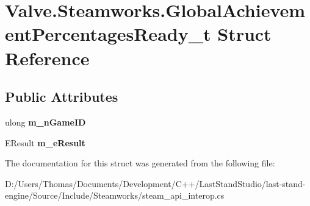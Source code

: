 \hypertarget{structValve_1_1Steamworks_1_1GlobalAchievementPercentagesReady__t}{}\section{Valve.\+Steamworks.\+Global\+Achievement\+Percentages\+Ready\+\_\+t Struct Reference}
\label{structValve_1_1Steamworks_1_1GlobalAchievementPercentagesReady__t}
\subsection*{Public Attributes}
\begin{DoxyCompactItemize}
\item 
\hypertarget{structValve_1_1Steamworks_1_1GlobalAchievementPercentagesReady__t_a77425795406927d23ceef9a3f353b278}{}ulong {\bfseries m\+\_\+n\+Game\+I\+D}\label{structValve_1_1Steamworks_1_1GlobalAchievementPercentagesReady__t_a77425795406927d23ceef9a3f353b278}

\item 
\hypertarget{structValve_1_1Steamworks_1_1GlobalAchievementPercentagesReady__t_aef45d07893b5ebfeaae5ac46131b3497}{}E\+Result {\bfseries m\+\_\+e\+Result}\label{structValve_1_1Steamworks_1_1GlobalAchievementPercentagesReady__t_aef45d07893b5ebfeaae5ac46131b3497}

\end{DoxyCompactItemize}


The documentation for this struct was generated from the following file\+:\begin{DoxyCompactItemize}
\item 
D\+:/\+Users/\+Thomas/\+Documents/\+Development/\+C++/\+Last\+Stand\+Studio/last-\/stand-\/engine/\+Source/\+Include/\+Steamworks/steam\+\_\+api\+\_\+interop.\+cs\end{DoxyCompactItemize}
